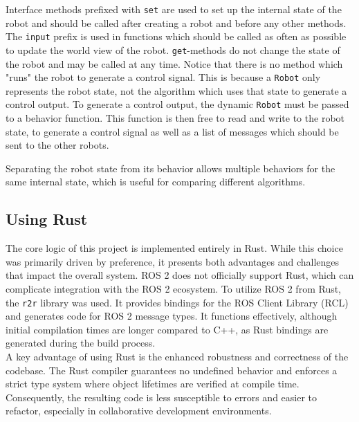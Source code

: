 Interface methods prefixed with \texttt{set} are used to set up the internal state of the robot and should be called after creating a robot and before any other methods. The \texttt{input} prefix is used in functions which should be called as often as possible to update the world view of the robot. \texttt{get}-methods do not change the state of the robot and may be called at any time. Notice that there is no method which "runs" the robot to generate a control signal. This is because a \texttt{Robot} only represents the robot state, not the algorithm which uses that state to generate a control output. To generate a control output, the dynamic \texttt{Robot} must be passed to a behavior function. This function is then free to read and write to the robot state, to generate a control signal as well as a list of messages which should be sent to the other robots.

Separating the robot state from its behavior allows multiple behaviors for the same internal state, which is useful for comparing different algorithms.

\subsection{Using Rust}
The core logic of this project is implemented entirely in Rust. While this choice was primarily driven by preference, it presents both advantages and challenges that impact the overall system. ROS 2 does not officially support Rust, which can complicate integration with the ROS 2 ecosystem. To utilize ROS 2 from Rust, the \texttt{r2r} library \cite{r2r} was used. It provides bindings for the ROS Client Library (RCL) and generates code for ROS 2 message types. It functions effectively, although initial compilation times are longer compared to C++, as Rust bindings are generated during the build process. \\

A key advantage of using Rust is the enhanced robustness and correctness of the codebase. The Rust compiler guarantees no undefined behavior and enforces a strict type system where object lifetimes are verified at compile time. Consequently, the resulting code is less susceptible to errors and easier to refactor, especially in collaborative development environments.

